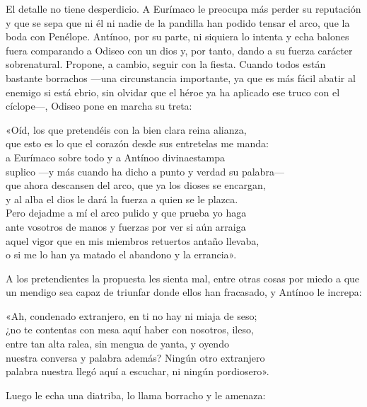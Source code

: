 El detalle no tiene desperdicio. A Eurímaco le preocupa más perder su reputación y que se sepa que ni él ni nadie de la pandilla han podido tensar el arco, que la boda con Penélope. Antínoo, por su parte, ni siquiera lo intenta y echa balones fuera comparando a Odiseo con un dios y, por tanto, dando a su fuerza carácter sobrenatural. Propone, a cambio, seguir con la fiesta. Cuando todos están bastante borrachos ---una circunstancia importante, ya que es más fácil abatir al enemigo si está ebrio, sin olvidar que el héroe ya ha aplicado ese truco con el cíclope---, Odiseo pone en marcha su treta:

\begin{versocita}
«Oíd, los que pretendéis con la bien clara reina alianza,\\
que esto es lo que el corazón desde sus entretelas me manda:\\
a Eurímaco sobre todo y a Antínoo divinaestampa\\
suplico ---y más cuando ha dicho a punto y verdad su palabra---\\
que ahora descansen del arco, que ya los dioses se encargan,\\
y al alba el dios le dará la fuerza a quien se le plazca.\\
Pero dejadme a mí el arco pulido y que prueba yo haga\\
ante vosotros de manos y fuerzas por ver si aún arraiga\\
aquel vigor que en mis miembros retuertos antaño llevaba,\\
o si me lo han ya matado el abandono y la errancia».
\end{versocita}

A los pretendientes la propuesta les sienta mal, entre otras cosas por miedo a que un mendigo sea capaz de triunfar donde ellos han fracasado, y Antínoo le increpa:

\begin{versocita}
«Ah, condenado extranjero, en ti no hay ni miaja de seso;\\
¿no te contentas con mesa aquí haber con nosotros, ileso,\\
entre tan alta ralea, sin mengua de yanta, y oyendo\\
nuestra conversa y palabra además? Ningún otro extranjero\\
palabra nuestra llegó aquí a escuchar, ni ningún pordiosero».
\end{versocita}

Luego le echa una diatriba, lo llama borracho y le amenaza:

